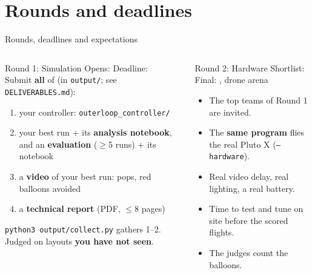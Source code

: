 \documentclass[aspectratio=169,11pt]{beamer}
\newcommand{\code}[1]{\texttt{\small #1}}
\begin{document}
\section{Rounds and deadlines}
\begin{frame}{Rounds, deadlines and expectations}
  \begin{columns}[T]
    \begin{block}{Round 1: Simulation}
      \small
      Opens: \textbf{\RoundOneOpens} \quad Deadline: \textbf{\RoundOneDeadline}\\
      Submit \textbf{all} of (in \code{output/}; see \code{DELIVERABLES.md}):
      \begin{enumerate}\footnotesize
        \item your controller: \code{outerloop\_controller/}
        \item your best run + its \textbf{analysis notebook}, and an
              \textbf{evaluation} ($\geq$5 runs) + its notebook
        \item a \textbf{video} of your best run: pops, red balloons avoided
        \item a \textbf{technical report} (PDF, $\leq$8 pages)
      \end{enumerate}
      \code{python3 output/collect.py} gathers 1--2.
      Judged on layouts \textbf{you have not seen}.
    \end{block}
    \begin{block}{Round 2: Hardware}
      \small
      Shortlist: \textbf{\ShortlistDate} \quad Final: \textbf{\RoundTwoDate}, drone arena\\[1mm]
      \begin{itemize}\small
        \item The top teams of Round 1 are invited.
        \item The \textbf{same program} flies the real Pluto X
              (\code{--hardware}).
        \item Real video delay, real lighting, a real battery.
        \item Time to test and tune on site before the scored flights.
        \item The judges count the balloons.
      \end{itemize}
    \end{block}
  \end{columns}
\end{frame}
\end{document}
